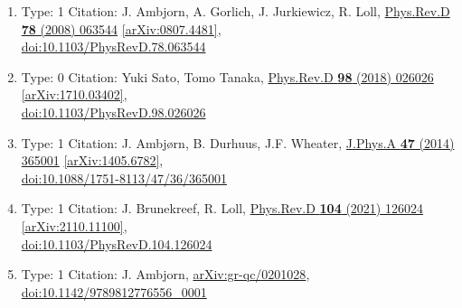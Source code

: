 \documentclass[a4paper,10pt]{article}
\begin{document}
\begin{enumerate}
\begin{enumerate}
  \item Type: 1 Citation: J. Ambjorn, A. Gorlich, J. Jurkiewicz, R. Loll, \href{https://www.doi.org/10.1103/PhysRevD.78.063544}{Phys.Rev.D {\bf 78} (2008) 063544}  \href{https://arxiv.org/abs/0807.4481}{[arXiv:0807.4481]},\\\href{https://www.doi.org/10.1103/PhysRevD.78.063544}{doi:10.1103/PhysRevD.78.063544}
  \item Type: 0 Citation: Yuki Sato, Tomo Tanaka, \href{https://www.doi.org/10.1103/PhysRevD.98.026026}{Phys.Rev.D {\bf 98} (2018) 026026}  \href{https://arxiv.org/abs/1710.03402}{[arXiv:1710.03402]},\\\href{https://www.doi.org/10.1103/PhysRevD.98.026026}{doi:10.1103/PhysRevD.98.026026}
  \item Type: 1 Citation: J. Ambjørn, B. Durhuus, J.F. Wheater, \href{https://www.doi.org/10.1088/1751-8113/47/36/365001}{J.Phys.A {\bf 47} (2014) 365001}  \href{https://arxiv.org/abs/1405.6782}{[arXiv:1405.6782]},\\\href{https://www.doi.org/10.1088/1751-8113/47/36/365001}{doi:10.1088/1751-8113/47/36/365001}
  \item Type: 1 Citation: J. Brunekreef, R. Loll, \href{https://www.doi.org/10.1103/PhysRevD.104.126024}{Phys.Rev.D {\bf 104} (2021) 126024}  \href{https://arxiv.org/abs/2110.11100}{[arXiv:2110.11100]},\\\href{https://www.doi.org/10.1103/PhysRevD.104.126024}{doi:10.1103/PhysRevD.104.126024}
  \item Type: 1 Citation: J. Ambjorn, \href{https://arxiv.org/abs/gr-qc/0201028}{arXiv:gr-qc/0201028},\\\href{https://www.doi.org/10.1142/9789812776556_0001}{doi:10.1142/9789812776556\_0001}

\end{enumerate}
\end{enumerate}
\end{document}
